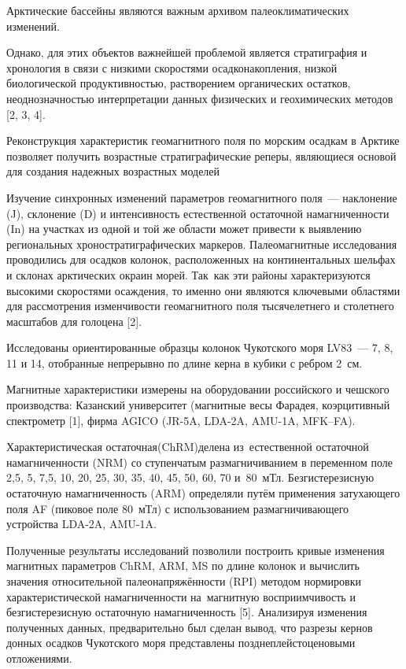  

\makeProcTitle
{}

Арктические бассейны являются важным архивом палеоклиматических
изменений.

Однако, для этих объектов важнейшей проблемой является стратиграфия и
хронология в связи с низкими скоростями осадконакопления, низкой
биологической продуктивностью, растворением органических остатков,
неоднозначностью интерпретации данных физических и геохимических методов
[2, 3, 4].

Реконструкция характеристик геомагнитного поля по морским осадкам в
Арктике позволяет получить возрастные стратиграфические реперы,
являющиеся основой для создания надежных возрастных моделей

Изучение синхронных изменений параметров геомагнитного поля~--- наклонение (J), склонение (D) и интенсивность естественной остаточной намагниченности (In) на участках из одной и той же области может привести к выявлению региональных хроностратиграфических маркеров. Палеомагнитные исследования проводились для осадков колонок, расположенных на континентальных шельфах и склонах арктических окраин морей. Так~как эти районы характеризуются высокими скоростями осаждения, то именно они являются ключевыми областями для рассмотрения изменчивости геомагнитного поля тысячелетнего и столетнего масштабов для голоцена [2].

Исследованы ориентированные образцы колонок Чукотского моря LV83~--- 7, 8,
11 и 14, отобранные непрерывно по длине керна в кубики с ребром 2~см.

Магнитные характеристики измерены на оборудовании российского и чешского
производства: Казанский университет (магнитные весы Фарадея,
коэрцитивный спектрометр [1], фирма AGICO (JR-5A, LDA-2A, AMU-1A,
MFK–FA).

Характеристическая остаточная (ChRM)\-де\-ле\-на из~ес\-тест\-вен\-ной остаточной намагниченности (NRM) со ступенчатым размагничиванием в переменном поле 2,5, 5, 7,5, 10, 20, 25, 30, 35, 40, 45, 50, 60, 70 и~80~мТл. Безгистерезисную остаточную намагниченность (ARM) определяли путём применения затухающего поля AF (пиковое поле 80~мТл) с использованием размагничивающего устройства LDA-2A, AMU-1A.

Полученные результаты  исследований позволили построить кривые изменения магнитных параметров  ChRM, ARM, MS по длине колонок и вычислить значения относительной палеонапряжённости (RPI) методом нормировки характеристической намагниченности на~магнитную восприимчивость и безгистерезисную остаточную намагниченность [5]. Анализируя изменения полученных данных, предварительно был сделан вывод, что разрезы кернов донных осадков Чукотского моря представлены позднеплейстоценовыми отложениями.



